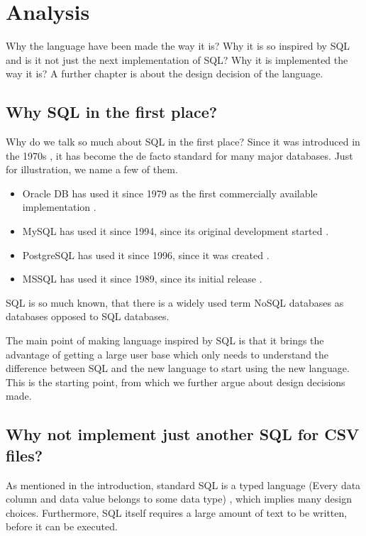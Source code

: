 \chapter{Analysis}
Why the language have been made the way it is? Why it is so inspired by SQL and is it not just the next implementation of SQL?
Why it is implemented the way it is?
A further chapter is about the design decision of the language.


\section{Why SQL in the first place?}
Why do we talk so much about SQL in the first place? Since it was introduced in the 1970s \cite{enwiki-sql}, it has
become the de facto standard for many major databases. Just for illustration, we name a few of them.
\begin{itemize}
    \item Oracle DB has used it since 1979 as the first commercially available implementation \cite{oracle-db-sql}. 
    \item MySQL has used it since 1994, since its original development started \cite{enwiki-mysql}.
    \item PostgreSQL has used it since 1996, since it was created \cite{postgres-birthday}. 
    \item MSSQL has used it since 1989, since its initial release \cite{enwiki-mssql}. 
\end{itemize}

SQL is so much known, that there is a widely used term NoSQL databases as databases opposed to SQL databases.

The main point of making language inspired by SQL is that it brings the advantage of getting a large user base which only needs to understand the difference between SQL and the new language to start using the new language. This is the starting point, from which we further argue about design decisions made.


\section{Why not implement just another SQL for CSV files?}
As mentioned in the introduction, standard SQL is a typed language (Every data column and data value belongs to some data type) \cite{ISO9075-2023}, 
which implies many design choices. Furthermore, SQL itself requires a large amount of text to be written,
before it can be executed. 

